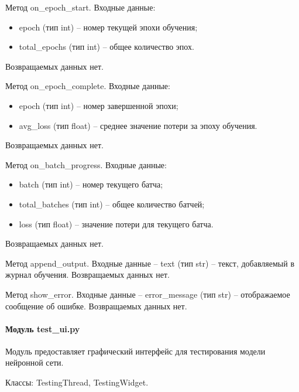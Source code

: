 Метод on\_epoch\_start. Входные данные:
\begin{itemize}
	\item epoch (тип int) -- номер текущей эпохи обучения;
	\item total\_epochs (тип int) -- общее количество эпох.
\end{itemize}
Возвращаемых данных нет.

Метод on\_epoch\_complete. Входные данные:
\begin{itemize}
	\item epoch (тип int) -- номер завершенной эпохи;
	\item avg\_loss (тип float) -- среднее значение потери за эпоху обучения.
\end{itemize}
Возвращаемых данных нет.

Метод on\_batch\_progress. Входные данные:
\begin{itemize}
	\item batch (тип int) -- номер текущего батча;
	\item total\_batches (тип int) -- общее количество батчей;
	\item loss (тип float) -- значение потери для текущего батча.
\end{itemize}
Возвращаемых данных нет.

Метод append\_output. Входные данные -- text (тип str) -- текст, добавляемый в журнал обучения. Возвращаемых данных нет.

Метод show\_error. Входные данные -- error\_message (тип str) -- отображаемое сообщение об ошибке. Возвращаемых данных нет.

\paragraph{Модуль test\_ui.py}

Модуль предоставляет графический интерфейс для тестирования модели нейронной сети.

Классы: TestingThread, TestingWidget.

